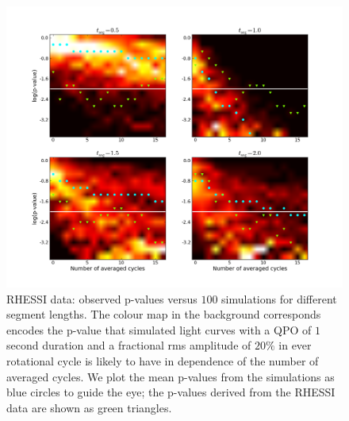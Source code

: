 \documentclass{emulateapj}
\begin{document}
\begin{figure}[htbp]
\begin{center}
\includegraphics[width=\textwidth]{1806_rhessi_1ssignal_all_pvalues.png}
\caption{RHESSI data: observed p-values versus $100$ simulations for different segment lengths. The colour map in the background corresponds encodes the p-value that simulated light curves with a QPO of $1$ second duration and a fractional rms amplitude of $20\%$ in ever rotational cycle is likely to have in dependence of the number of averaged cycles. We plot the mean p-values from the simulations as blue circles to guide the eye; the p-values derived from the RHESSI data are shown as green triangles.}
\label{fig:rhessi_sims1_pvalues}
\end{center}
\end{figure}
\end{document}
